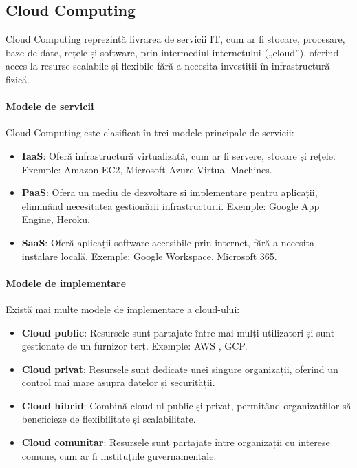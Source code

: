 \documentclass[titlepage,12pt]{article}
\begin{document}
\subsection{Cloud Computing}

Cloud Computing reprezintă livrarea de servicii IT, cum ar fi stocare, procesare, baze de date, rețele și software, prin intermediul internetului („cloud”), oferind acces la resurse scalabile și flexibile fără a necesita investiții în infrastructură fizică.

\paragraph{Modele de servicii}
Cloud Computing este clasificat în trei modele principale de servicii:
\begin{itemize}
    \item \textbf{\ac {IaaS}}: Oferă infrastructură virtualizată, cum ar fi servere, stocare și rețele. Exemple: Amazon EC2, Microsoft Azure Virtual Machines.
    \item \textbf{\ac {PaaS}}: Oferă un mediu de dezvoltare și implementare pentru aplicații, eliminând necesitatea gestionării infrastructurii. Exemple: Google App Engine, Heroku.
    \item \textbf{\ac {SaaS}}: Oferă aplicații software accesibile prin internet, fără a necesita instalare locală. Exemple: Google Workspace, Microsoft 365.
\end{itemize}

\paragraph{Modele de implementare}
Există mai multe modele de implementare a cloud-ului:
\begin{itemize}
    \item \textbf{Cloud public}: Resursele sunt partajate între mai mulți utilizatori și sunt gestionate de un furnizor terț. Exemple: \ac {AWS} , \ac {GCP}.
    \item \textbf{Cloud privat}: Resursele sunt dedicate unei singure organizații, oferind un control mai mare asupra datelor și securității.
    \item \textbf{Cloud hibrid}: Combină cloud-ul public și privat, permițând organizațiilor să beneficieze de flexibilitate și scalabilitate.
    \item \textbf{Cloud comunitar}: Resursele sunt partajate între organizații cu interese comune, cum ar fi instituțiile guvernamentale.
\end{itemize}
\end{document}
